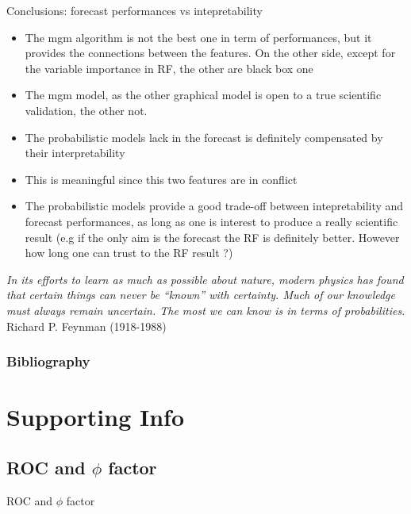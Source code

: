 \documentclass{beamer}
\begin{document}
\begin{frame}{Conclusions: forecast performances vs intepretability}
\begin{itemize}
\item The mgm algorithm is not the best one in term of performances, but it provides the connections between the features. On the other side, except for the variable importance in RF, the other are black box one
\item The mgm model, as the other graphical model is open to a true scientific validation, the other not. 
\item The probabilistic models lack in the forecast is definitely compensated by their interpretability 
\item This is meaningful since this two features are in conflict 
\item The probabilistic models provide a good trade-off between intepretability and forecast performances, as long as one is interest to produce a really scientific result (e.g if the only aim is the forecast the RF is definitely better. However how long one can trust to the RF result ?)
\end{itemize}
\end{frame}

\begin{frame}

{\Large \textit{In its efforts to learn as much as possible about nature, modern physics has found that certain things can never be “known” with certainty. Much of our knowledge must always remain uncertain. The most we can know is in terms of probabilities.} Richard P. Feynman (1918-1988)}
\end{frame}



\begin{frame}[t,allowframebreaks]
\frametitle{Bibliography}
\printbibliography
\end{frame}


\section{Supporting Info}

\subsection{ROC and $\phi$ factor}
\begin{frame}{}
\begin{center}
{\Huge ROC and $\phi$ factor}
\end{center}
\end{frame}
\end{document}
